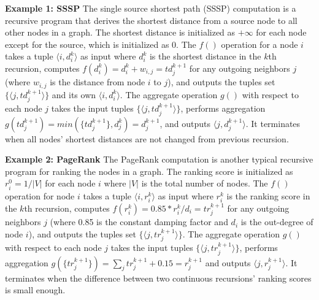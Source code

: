 \textbf{Example 1: SSSP} The single source shortest path (SSSP) computation is a recursive program that derives the shortest distance from a source node to all other nodes in a graph. The shortest distance is initialized as $+\infty$ for each node except for the source, which is initialized as 0. The $f()$ operation for a node $i$ takes a tuple $\langle i,d_i^k\rangle$ as input where $d_i^k$ is the shortest distance in the $k$th recursion, computes $f(d_i^k)=d_i^k+w_{i,j}=td_j^{k+1}$ for any outgoing neighbors $j$ (where $w_{i,j}$ is the distance from node $i$ to $j$), and outputs the tuples set $\{\langle j,td_j^{k+1}\rangle\}$ and its own $\langle i,d_i^k\rangle$. The aggregate operation $g()$ with respect to each node $j$ takes the input tuples $\{\langle j,td_j^{k+1}\rangle\}$, performs aggregation $g(td_j^{k+1})=min(\{td_j^{k+1}\},d_j^k)=d_j^{k+1}$, and outputs $\langle j,d_j^{k+1}\rangle$. It terminates when all nodes' shortest distances are not changed from previous recursion.

\textbf{Example 2: PageRank} The PageRank computation is another typical recursive program for ranking the nodes in a graph. The ranking score is initialized as $r_i^0=1/|V|$ for each node $i$ where $|V|$ is the total number of nodes. The $f()$ operation for node $i$ takes a tuple $\langle i,r_i^k\rangle$ as input where $r_i^k$ is the ranking score in the $k$th recursion, computes $f(r_i^k)=0.85*r_i^k/d_i=tr_j^{k+1}$ for any outgoing neighbors $j$ (where 0.85 is the constant damping factor and $d_i$ is the out-degree of node $i$), and outputs the tuples set $\{\langle j,tr_j^{k+1}\rangle\}$. The aggregate operation $g()$ with respect to each node $j$ takes the input tuples $\{\langle j,tr_j^{k+1}\rangle\}$, performs aggregation $g(\{tr_j^{k+1}\})=\sum_j{tr_j^{k+1}}+0.15=r_j^{k+1}$ and outputs $\langle j,r_j^{k+1}\rangle$. It terminates when the difference between two continuous recursions' ranking scores is small enough.
